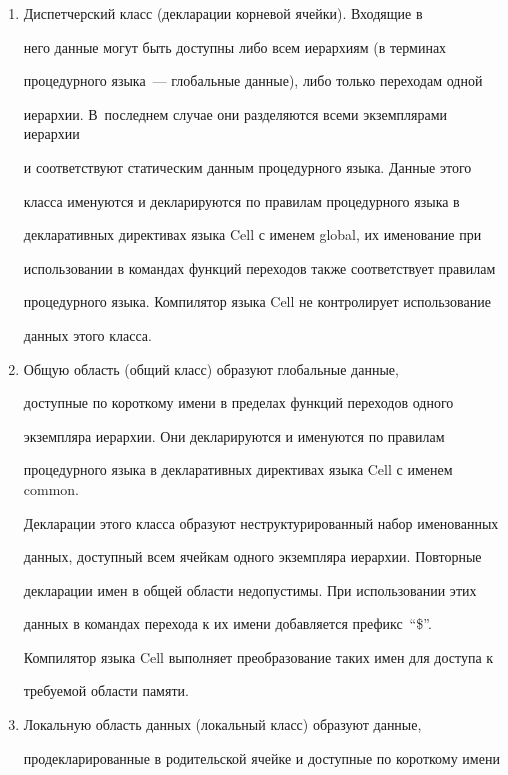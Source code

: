       \begin{enumerate}[1.]


     \item Диспетчерский класс (декларации корневой ячейки). Входящие в 


него данные могут быть доступны либо всем иерархиям (в терминах 


процедурного языка~--- глобальные данные), либо только переходам одной 


иерархии. В~последнем случае они разделяются всеми экземплярами иерархии 


и соответствуют статическим данным процедурного языка. Данные этого 


класса именуются и декларируются по правилам процедурного языка в 


декларативных директивах языка Cell с именем global, их именование при 


использовании в командах функций переходов также соответствует правилам 


процедурного языка. Компилятор языка Cell не контролирует использование 


данных этого класса.


     \item Общую область (общий класс) образуют глобальные данные, 


доступные по короткому имени в пределах функций переходов одного 


экземпляра иерархии. Они декларируются и именуются по правилам 


процедурного языка в декларативных директивах языка Cell с именем common. 


Декларации этого класса образуют неструктурированный набор именованных 


данных, доступный всем ячейкам одного экземпляра иерархии. Повторные 


декларации имен в общей области недопустимы. При использовании этих 


данных в командах перехода к их имени добавляется префикс~``\$''. 


Компилятор языка Cell выполняет преобразование таких имен для доступа к 


требуемой области памяти.


     \item Локальную область данных (локальный класс) образуют данные, 


продекларированные в родительской ячейке и доступные по короткому имени 



\end{enumerate}

